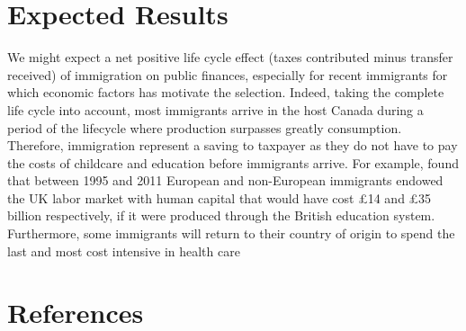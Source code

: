   \section*{Expected Results}\label{sec:results}
  We might expect a net positive life cycle effect (taxes contributed minus transfer received) of immigration on public finances, especially for recent immigrants for which economic factors has motivate the selection. Indeed, taking the complete life cycle into account, most immigrants arrive in the host Canada during a period of the lifecycle where production surpasses greatly consumption. Therefore, immigration represent a saving to taxpayer as they do not have to pay the costs of childcare and education before immigrants arrive. For example, \citet{Dustmann:2014dr} found that between 1995 and 2011 European and non-European immigrants endowed the UK labor market with human capital that would have cost £14 and £35 billion respectively, if it were produced through the British education system. Furthermore, some immigrants will return to their country of origin to spend the last and most cost intensive in health care \citep{Bratsberg:2014cl}

  \newpage
  \section*{References}
    \printbibliography[heading=none]

